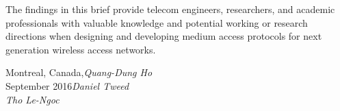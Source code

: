 The findings in this brief provide telecom engineers, researchers, and academic professionals with valuable knowledge and potential working or research directions when designing and developing medium access protocols for next generation wireless access networks.

\vspace{\baselineskip}
\begin{flushright}\noindent
Montreal, Canada,\hfill {\it Quang-Dung Ho}\\
September 2016\hfill {\it Daniel Tweed}\\
\hfill {\it Tho Le-Ngoc}\\
\end{flushright}